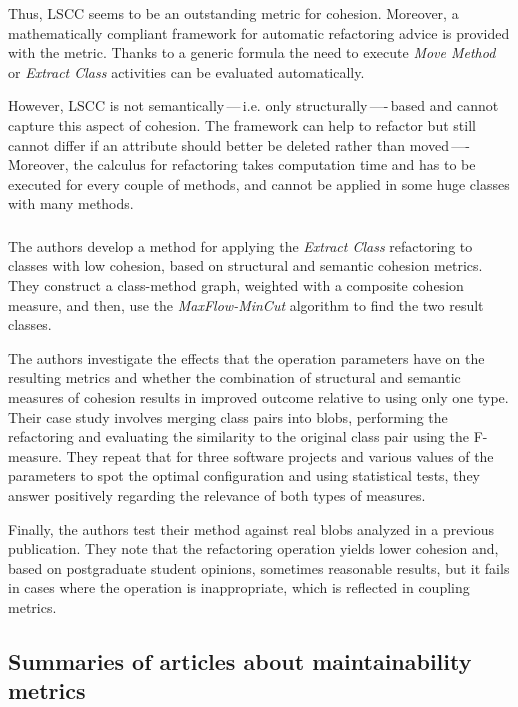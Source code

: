         Thus, LSCC seems to be an outstanding metric for cohesion. Moreover, a mathematically compliant framework for automatic refactoring advice is provided with the metric. Thanks to a generic formula the need to execute \textit{Move Method} or \textit{Extract Class} activities can be evaluated automatically.
        
        However, LSCC is not semantically\,---\,i.e. only structurally\,----\,based and cannot capture this aspect of cohesion. The framework can help to refactor but still cannot differ if an attribute should better be deleted rather than moved\,----\. Moreover, the calculus for refactoring takes computation time and has to be executed for every couple of methods, and cannot be applied in some huge classes with many methods.
        
    \subsubsection{ \cite{s29_cohesion}}
    
        The authors develop a method for applying the \textit{Extract Class} refactoring to classes with low cohesion, based on structural and semantic cohesion metrics. They construct a class-method graph, weighted with a composite cohesion measure, and then, use the \textit{MaxFlow-MinCut} algorithm to find the two result classes.
        
        The authors investigate the effects that the operation parameters have on the resulting metrics and whether the combination of structural and semantic measures of cohesion results in improved outcome relative to using only one type. Their case study involves merging class pairs into blobs, performing the refactoring and evaluating the similarity to the original class pair using the F-measure. They repeat that for three software projects and various values of the parameters to spot the optimal configuration and using statistical tests, they answer positively regarding the relevance of both types of measures.

        Finally, the authors test their method against real blobs analyzed in a previous publication. They note that the refactoring operation yields lower cohesion and, based on postgraduate student opinions, sometimes reasonable results, but it fails in cases where the operation is inappropriate, which is reflected in coupling metrics.
    
\subsection{Summaries of articles about maintainability metrics}

